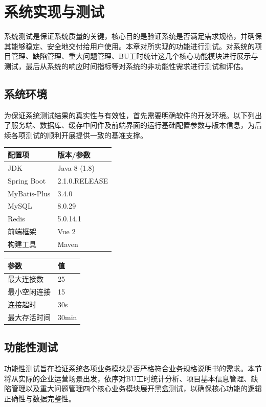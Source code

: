 \chapter{系统实现与测试}
系统测试是保证系统质量的关键，核心目的是验证系统是否满足需求规格，并确保其能够稳定、安全地交付给用户使用。本章对所实现的功能进行测试。对系统的项目管理、缺陷管理、重大问题管理、BU工时统计这几个核心功能模块进行展示与测试，最后从系统的响应时间指标等对系统的非功能性需求进行测试和评估。
\section{系统环境}
为保证系统测试结果的真实性与有效性，首先需要明确软件的开发环境。以下列出了服务端、数据库、缓存中间件及前端界面的运行基础配置参数与版本信息，为后续各项测试的顺利开展提供一致的基准支撑。
\begin{center}
	{\songti\fontsize{10.5pt}{12.6pt}\selectfont
		\begin{tabular}{ll}
			\toprule
			配置项 & 版本/参数 \\
			\midrule
			JDK & Java 8 (1.8) \\
			Spring Boot & 2.1.0.RELEASE \\
			MyBatis-Plus & 3.4.0 \\
			MySQL & 8.0.29 \\
			Redis & 5.0.14.1 \\
			前端框架 & Vue 2 \\
			构建工具 & Maven \\
			\bottomrule
		\end{tabular}
	}
\end{center}

\begin{center}
	{\songti\fontsize{10.5pt}{12.6pt}\selectfont
		\begin{tabular}{ll}
			\toprule
			参数 & 值 \\
			\midrule
			最大连接数 & 25 \\
			最小空闲连接 & 15 \\
			连接超时 & 30s \\
			最大存活时间 & 30min \\
			\bottomrule
		\end{tabular}
	}
\end{center}

\FloatBarrier
\section{功能性测试}
功能性测试旨在验证系统各项业务模块是否严格符合业务规格说明书的需求。本节将从实际的企业运营场景出发，依序对BU工时统计分析、项目基本信息管理、缺陷管理以及重大问题管理四个核心业务模块展开黑盒测试，以确保核心功能的逻辑正确性与数据完整性。

